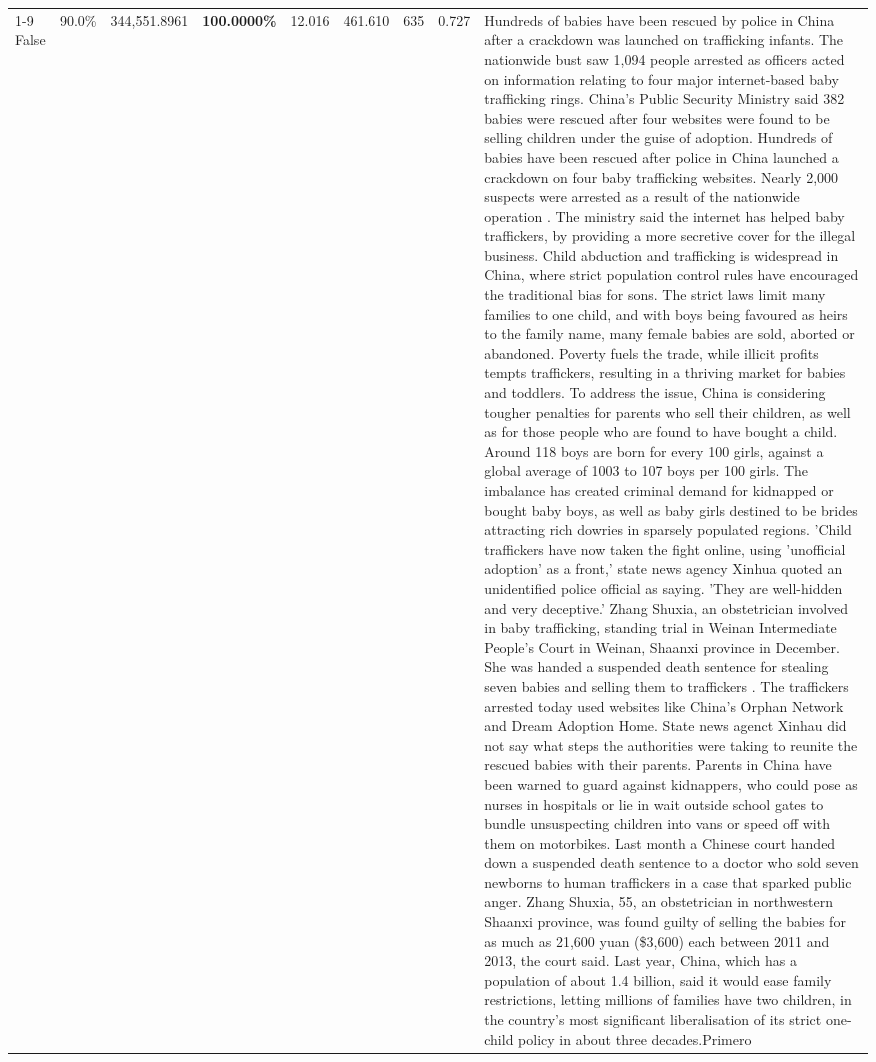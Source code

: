 \begin{table}[H]
\begin{tabular}{lllrlllll}
\cline{1-9}
False & 90.0\% & 344,551.8961 & \bfseries \color{red} 100.0000\% & 12.016 & 461.610 & 635 & 0.727 & Hundreds of babies have been rescued by police in China after a crackdown was launched on trafficking infants. The nationwide bust saw 1,094 people arrested as officers acted on information relating to four major internet-based baby trafficking rings. China's Public Security Ministry said 382 babies were rescued after four websites were found to be selling children under the guise of adoption. Hundreds of babies have been rescued after police in China launched a crackdown on four baby trafficking websites. Nearly 2,000 suspects were arrested as a result of the nationwide operation . The ministry said the internet has helped baby traffickers, by providing a more secretive cover for the illegal business. Child abduction and trafficking is widespread in China, where strict population control rules have encouraged the traditional bias for sons. The strict laws limit many families to one child, and with boys being favoured as heirs to the family name, many female babies are sold, aborted or abandoned. Poverty fuels the trade, while illicit profits tempts traffickers, resulting in a thriving market for babies and toddlers. To address the issue, China is considering tougher penalties for parents who sell their children, as well as for those people who are found to have bought a child. Around 118 boys are born for every 100 girls, against a global average of 1003 to 107 boys per 100 girls. The imbalance has created criminal demand for kidnapped or bought baby boys, as well as baby girls destined to be brides attracting rich dowries in sparsely populated regions. 'Child traffickers have now taken the fight online, using 'unofficial adoption' as a front,' state news agency Xinhua quoted an unidentified police official as saying. 'They are well-hidden and very deceptive.' Zhang Shuxia, an obstetrician involved in baby trafficking, standing trial in Weinan Intermediate People's Court in Weinan, Shaanxi province in December. She was handed a suspended death sentence for stealing seven babies and selling them to traffickers . The traffickers arrested today used websites like China's Orphan Network and Dream Adoption Home. State news agenct Xinhau did not say what steps the authorities were taking to reunite the rescued babies with their parents. Parents in China have been warned to guard against kidnappers, who could pose as nurses in hospitals or lie in wait outside school gates to bundle unsuspecting children into vans or speed off with them on motorbikes. Last month a Chinese court handed down a suspended death sentence to a doctor who sold seven newborns to human traffickers in a case that sparked public anger. Zhang Shuxia, 55, an obstetrician in northwestern Shaanxi province, was found guilty of selling the babies for as much as 21,600 yuan (\$3,600) each between 2011 and 2013, the court said. Last year, China, which has a population of about 1.4 billion, said it would ease family restrictions, letting millions of families have two children, in the country's most significant liberalisation of its strict one-child policy in about three decades.Primero \\

\end{tabular}
\end{table}
